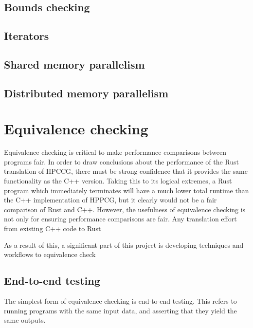 \subsection{Bounds checking}
\label{sec:translation-bounds-checking}

\subsection{Iterators}
\label{sec:translation-iterators}

\subsection{Shared memory parallelism}
\label{sec:translation-rayon}

\subsection{Distributed memory parallelism}
\label{sec:translation-mpi}


\section{Equivalence checking}
\label{sec:equivalence-checking} %

Equivalence checking is critical to make performance comparisons between programs fair. In order to draw conclusions about the performance of the Rust translation of HPCCG, there must be strong confidence that it provides the same functionality as the C++ version. Taking this to its logical extremes, a Rust program which immediately terminates will have a much lower total runtime than the C++ implementation of HPPCG, but it clearly would not be a fair comparison of Rust and C++. However, the usefulness of equivalence checking is not only for ensuring performance comparisons are fair. Any translation effort from existing C++ code to Rust 

As a result of this, a significant part of this project is developing techniques and workflows to equivalence check

\subsection{End-to-end testing}
\label{sec:equivalence-end-to-end}

The simplest form of equivalence checking is end-to-end testing. This refers to running programs with the same input data, and asserting that they yield the same outputs.

